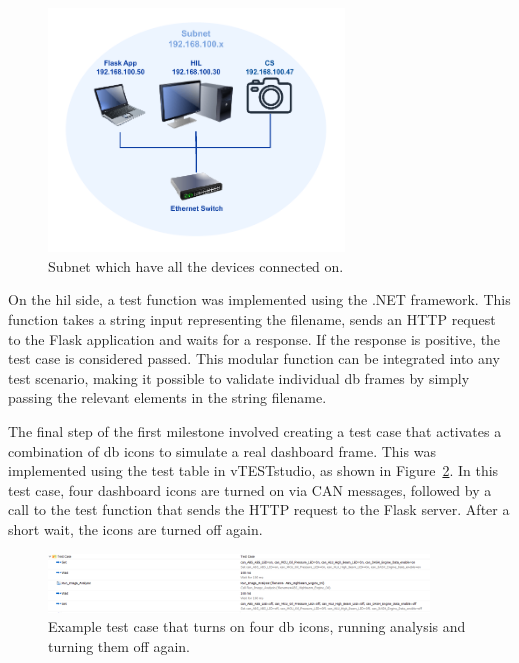 \begin{figure}[!h]
    \centering
    \includegraphics[width=0.7\textwidth]{Figures/diagrams/Network.pdf}
    \caption{Subnet which have all the devices connected on.}
    \label{Network}
\end{figure}

On the \gls{hil} side, a test function was implemented using the .NET framework. This function takes a string input representing the filename, sends an HTTP request to the Flask application and waits for a response. If the response is positive, the test case is considered passed. This modular function can be integrated into any test scenario, making it possible to validate individual \gls{db} frames by simply passing the relevant elements in the string filename.

The final step of the first milestone involved creating a test case that activates a combination of \gls{db} icons to simulate a real dashboard frame. This was implemented using the test table in vTESTstudio, as shown in Figure~\ref{Test_Case_1}. In this test case, four dashboard icons are turned on via CAN messages, followed by a call to the test function that sends the HTTP request to the Flask server. After a short wait, the icons are turned off again.

\begin{figure}[!h]
    \centering
    \includegraphics[width=0.9\textwidth]{Figures/Test_Case_1.png}
    \caption{Example test case that turns on four \gls{db} icons, running analysis and turning them off again.}
    \label{Test_Case_1}
\end{figure}


